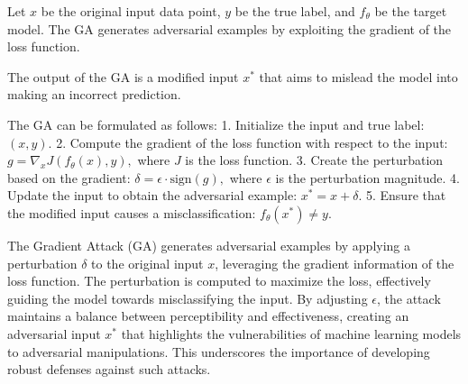 Let \( x \) be the original input data point, \( y \) be the true label, and \( f_{\theta} \) be the target model. The GA generates adversarial examples by exploiting the gradient of the loss function.

The output of the GA is a modified input \( x^* \) that aims to mislead the model into making an incorrect prediction.

The GA can be formulated as follows:
1. Initialize the input and true label:
   $
   (x, y).
   $
2. Compute the gradient of the loss function with respect to the input:
   $
   g = \nabla_x J(f_{\theta}(x), y),
   $
   where \( J \) is the loss function.
3. Create the perturbation based on the gradient:
   $
   \delta = \epsilon \cdot \text{sign}(g),
   $
   where \( \epsilon \) is the perturbation magnitude.
4. Update the input to obtain the adversarial example:
   $
   x^* = x + \delta.
   $
5. Ensure that the modified input causes a misclassification:
   $
   f_{\theta}(x^*) \neq y.
   $

The Gradient Attack (GA) generates adversarial examples by applying a perturbation \( \delta \) to the original input \( x \), leveraging the gradient information of the loss function. The perturbation is computed to maximize the loss, effectively guiding the model towards misclassifying the input. By adjusting \( \epsilon \), the attack maintains a balance between perceptibility and effectiveness, creating an adversarial input \( x^* \) that highlights the vulnerabilities of machine learning models to adversarial manipulations. This underscores the importance of developing robust defenses against such attacks.
